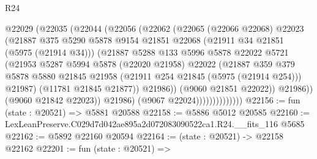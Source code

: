 \begin{lexlean}{R24}
\begin{coremodule}
                            @22029
                              (@22035
                                (@22044
                                  (@22056
                                    (@22062
                                      (@22065
                                        (@22066 @22068)
                                        @22023
                                        (@21887
                                          @375
                                          @5290
                                          @5878
                                          @9154
                                          @21851
                                          @22068
                                          (@21911 @34 @21851 (@5975 (@21914 @34)))
                                          (@21887
                                            @5288
                                            @133
                                            @5996
                                            @5878
                                            @22022
                                            @5721
                                            (@21953
                                              @5287
                                              @5994
                                              @5878
                                              (@22020 @21958)
                                              @22022
                                              (@21887
                                                @359
                                                @379
                                                @5878
                                                @5880
                                                @21845
                                                @21958
                                                (@21911 @254 @21845 (@5975 (@21914 @254)))
                                                @21987)
                                              (@11781 @21845 @21877))
                                            @21986))
                                        (@9060 @21851 @22022))
                                      @21986))
                                  (@9060 @21842 @22023))
                                @21986)
                              (@9067 @22024))))))))))))))
@22156 := fun (state : @20521) => @5881 @20588
@22158 := @5886 @5012 @20585
@22160 := LexLeanPreserve.C029d7d042ae895a2d072083090522ca1.R24.__fits_116 @5685
@22162 := @5892 @22160 @20594
@22164 := (state : @20521) -> @22158 @22162
@22201 := fun (state : @20521) =>

\end{coremodule}
\end{lexlean}
